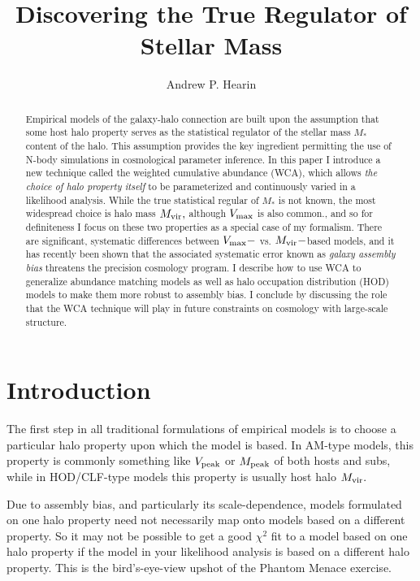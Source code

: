 \documentclass[usenatbib,usegraphicx,letterpaper]{mn2e}
\newcommand{\vmax}{V_{\rm max}}
\newcommand{\mvir}{M_{\rm vir}}
\newcommand{\mpeak}{M_{\rm peak}}
\newcommand{\vpeak}{V_{\rm peak}}
\newcommand{\mstar}{M_{\ast}}
\begin{document}
\title[Generalized Galaxy-Halo Modeling]
{Discovering the True Regulator of Stellar Mass}

\author[A.P. Hearin]{Andrew P. Hearin}

\maketitle




\begin{abstract}
Empirical models of the galaxy-halo connection are built upon the assumption that some host halo property serves as the statistical regulator of the stellar mass $\mstar$ content of the halo. This assumption provides the key ingredient permitting the use of N-body simulations in cosmological parameter inference. In this paper I introduce a new technique called the weighted cumulative abundance (WCA), which allows {\em the choice of halo property itself} to be parameterized and continuously varied in a likelihood analysis. While the true statistical regular of $\mstar$ is not known, the most widespread choice is halo mass $\mvir,$ although $\vmax$ is also common., and so for definiteness I focus on these two properties as a special case of my formalism. There are significant, systematic differences between $\vmax-$ vs. $\mvir-$based models, and it has recently been shown that the associated systematic error known as {\em galaxy assembly bias} threatens the precision cosmology program.  I describe how to use WCA to  generalize abundance matching models as well as halo occupation distribution (HOD) models to make them more robust to assembly bias. I conclude by discussing the role that the WCA technique will play in future constraints on cosmology with large-scale structure. 
\end{abstract}


\section{Introduction}

The first step in all traditional formulations of empirical models is to choose a particular halo property upon which the model is based. In AM-type models, this property is commonly something like $\vpeak$ or $\mpeak$ of both hosts and subs, while in HOD/CLF-type models this property is usually host halo $\mvir.$ 

Due to assembly bias, and particularly its scale-dependence, models formulated on one halo property need not necessarily map onto models based on a different property. So it may not be possible to get a good $\chi^2$ fit to a model based on one halo property if the model in your likelihood analysis is based on a different halo property. This is the bird's-eye-view upshot of the Phantom Menace exercise. 
\end{document}
